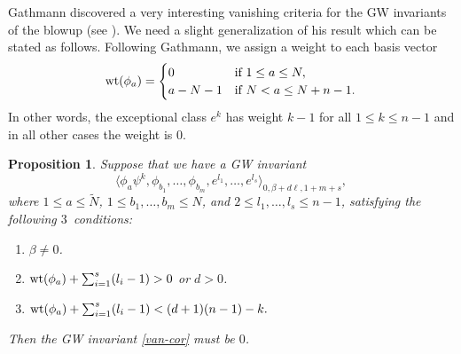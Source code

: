 \documentclass[pdftex]{sigma}
\numberwithin{equation}{section}
\newtheorem{Proposition}[Theorem]{Proposition}
\begin{document}
Gathmann discovered a very interesting vanishing criteria for the GW
invariants of the blowup (see \cite{Gat}). We need a slight generalization of his
result which can be stated as follows. Following Gathmann, we
assign a weight to each basis vector
\[
{\rm wt}(\phi_a) = \begin{cases}
 0 & \mbox{if } 1\leq a\leq N,\\
 a-N-1 & \mbox{if } N<a\leq N+n-1.
\end{cases}
\]
In other words, the exceptional class $e^k$ has weight $k-1$ for all
$1\leq k\leq n-1$ and in all other cases the weight is $0$.
\begin{Proposition}\label{prop:van}
Suppose that we have a GW invariant
\begin{equation}\label{van-cor}
\big\langle \phi_a \psi^k,
\phi_{b_1},\dots,\phi_{b_m},
e^{l_1},\dots, e^{l_s}
\big\rangle_{0,\beta+ d\ell, 1+m+s},
\end{equation}
where $1\leq a\leq \widetilde{N}$, $1\leq b_1,\dots,b_m\leq N$, and
$2\leq l_1,\dots,l_s\leq n-1$, satisfying the following $3$~conditions:
\begin{enumerate}\itemsep=0pt
\item[$(i)$]
 $\beta\neq 0$.
\item[$(ii)$]
 ${\rm wt}(\phi_a)+ \sum_{i=1}^s (l_i-1) >0$ or $d>0$.
\item[$(iii)$]
 ${\rm wt}(\phi_a)+ \sum_{i=1}^s (l_i-1) < (d+1)(n-1)-k.$
\end{enumerate}
Then the GW invariant \eqref{van-cor} must be $0$.
\end{Proposition}
\end{document}
